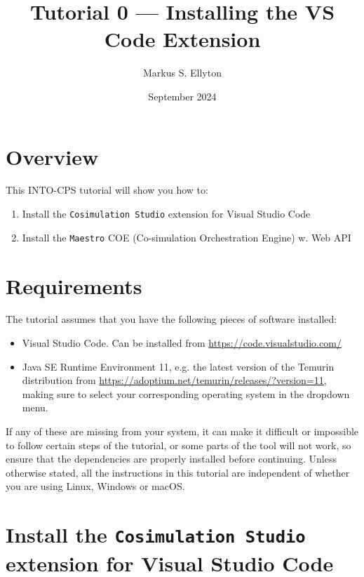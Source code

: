 \documentclass[11pt,a4paper]{../tutorial}
\title{Tutorial 0 --- Installing the VS Code Extension}
\date{September 2024}
\author{Markus S. Ellyton}
\newcommand{\JavaURL}{https://adoptium.net/temurin/releases/?version=11}
\newcommand{\VSCodeURL}{https://code.visualstudio.com/}
\newcommand{\cosimext}{\texttt{Cosimulation Studio}\xspace}
\newcommand{\maestro}{\texttt{Maestro}\xspace}
\begin{document}
\section*{Overview}

This INTO-CPS tutorial will show you how to:

\begin{enumerate}[noitemsep]
\item Install the \cosimext{} extension for Visual Studio Code
\item Install the \maestro{} COE (Co-simulation Orchestration Engine) w. Web API
\end{enumerate}

\section*{Requirements}

The tutorial assumes that you have the following pieces of software installed:

\begin{itemize}[noitemsep]
	\item Visual Studio Code. Can be installed from \url{\VSCodeURL}
	\item Java SE Runtime Environment 11, e.g. the latest version of the Temurin distribution from \url{\JavaURL}, making sure to select your corresponding operating system in the dropdown menu. 
\end{itemize}

If any of these are missing from your system, it can make it difficult or impossible to follow certain steps of the tutorial, or some parts of the tool will not work, so ensure that the dependencies are properly installed before continuing. Unless otherwise stated, all the instructions in this tutorial are independent of whether you are using Linux, Windows or macOS.

\section{Install the \cosimext{} extension for Visual Studio Code}
\end{document}
